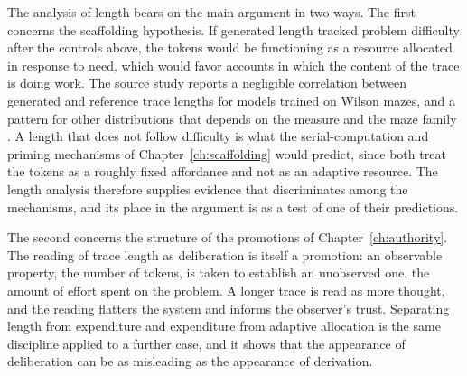The analysis of length bears on the main argument in two ways. The first concerns the scaffolding hypothesis. If generated length tracked problem difficulty after the controls above, the tokens would be functioning as a resource allocated in response to need, which would favor accounts in which the content of the trace is doing work. The source study reports a negligible correlation between generated and reference trace lengths for models trained on Wilson mazes, and a pattern for other distributions that depends on the measure and the maze family \cite{valmeekam2026}. A length that does not follow difficulty is what the serial-computation and priming mechanisms of Chapter~\ref{ch:scaffolding} would predict, since both treat the tokens as a roughly fixed affordance and not as an adaptive resource. The length analysis therefore supplies evidence that discriminates among the mechanisms, and its place in the argument is as a test of one of their predictions.

The second concerns the structure of the promotions of Chapter~\ref{ch:authority}. The reading of trace length as deliberation is itself a promotion: an observable property, the number of tokens, is taken to establish an unobserved one, the amount of effort spent on the problem. A longer trace is read as more thought, and the reading flatters the system and informs the observer's trust. Separating length from expenditure and expenditure from adaptive allocation is the same discipline applied to a further case, and it shows that the appearance of deliberation can be as misleading as the appearance of derivation.
